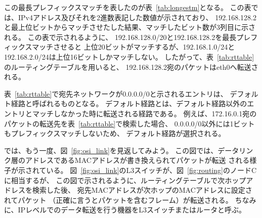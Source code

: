 この最長プレフィックスマッチを表したのが表~\ref{tab:longestm}となる。
この表では、IPv4アドレス及びそれを2進数表記した数値が示されており、
192.168.128.2と最上位ビットからマッチさせたした結果、マッチしたビット数が3列目に示される。
この表で示されるように、
192.168.128.0/20と192.168.128.2を最長プレフィックスマッチさせると
上位20ビットがマッチするが、192.168.1.0/24と192.168.2.0/24は上位16ビットしかマッチしない。
したがって、表~\ref{tab:rttable}のルーティングテーブルを用いると、
192.168.128.2宛のパケットはeth0へ転送される。

表~\ref{tab:rttable}で宛先ネットワークが0.0.0.0/0と示されるエントリは、
デフォルト経路と呼ばれるものとなる。
デフォルト経路とは、デフォルト経路以外のエントリとマッチしなかった時に転送される経路である。
例えば、172.16.0.1宛のパケットの転送先を表~\ref{tab:rttable}で検索した場合、
0.0.0.0/0以外には1ビットもプレフィックスマッチしないため、
デフォルト経路が選択される。

では、もう一度、図~\ref{fig:osi_link}を見返してみよう。
この図では、データリンク層のアドレスであるMACアドレスが書き換えられてパケットが転送
される様子が示されている。
図~\ref{fig:osi_link}のL3スイッチが、図~\ref{fig:routing}のノードCに相当するが、
この図で示されるように、ルーティングテーブルで次ホップアドレスを検索した後、
宛先MACアドレスが次ホップのMACアドレスに設定されてパケット
（正確に言うとパケットを含むフレーム）が転送される。
ちなみに、IPレベルでのデータ転送を行う機器をL3スイッチまたはルータと呼ぶ。

